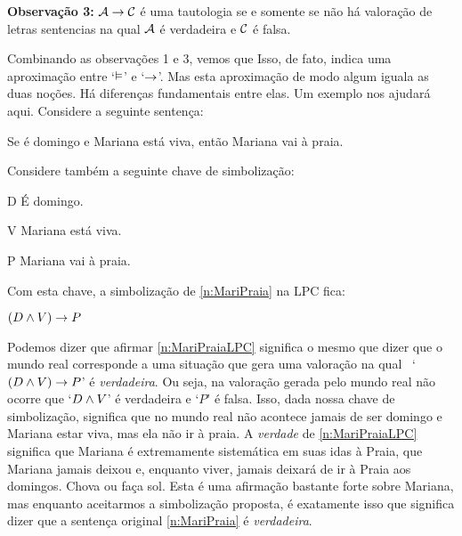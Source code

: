 	\begin{ebullet}
		\item[\textbf{Observação 3:}] $\mathcal{A} \rightarrow \mathcal{C}$ é uma tautologia se e somente se não há valoração de letras sentencias na qual $\mathcal{A}$ é verdadeira e $\mathcal{C}$ é falsa.
	\end{ebullet}
Combinando as observações 1 e 3, vemos que
Isso, de fato, indica uma aproximação entre `$\vDash$' e `$\rightarrow$'.
Mas esta aproximação de modo algum iguala as duas noções.
Há diferenças fundamentais entre elas.
Um exemplo nos ajudará aqui.
Considere a seguinte sentença:
	\begin{earg}\setcounter{eargnum}{4}
		\item \label{n:MariPraia}Se é domingo e Mariana está viva, então Mariana vai à praia.
	\end{earg}
Considere também a seguinte chave de simbolização:
\begin{ekey}
	\item[D] É domingo.
	\item [V] Mariana está viva.
	\item[P] Mariana vai à praia.
\end{ekey}
Com esta chave, a simbolização de \ref{n:MariPraia} na LPC fica:
	\begin{earg}\setcounter{eargnum}{5}
		\item \label{n:MariPraiaLPC}$(D \wedge V) \rightarrow P$
	\end{earg}
Podemos dizer que afirmar \ref{n:MariPraiaLPC} significa o mesmo que dizer que o mundo real corresponde a uma situação que gera uma valoração na qual \mbox{ `$(D \wedge V) \rightarrow P$'} é \emph{verdadeira}.
Ou seja, na valoração gerada pelo mundo real não ocorre que `$D \wedge V$' é verdadeira e `$P$' é falsa.
Isso, dada nossa chave de simbolização, significa que no mundo real não acontece jamais de ser domingo e Mariana estar viva, mas ela não ir à praia.
A \emph{verdade} de \ref{n:MariPraiaLPC} significa que Mariana é extremamente sistemática em suas idas à Praia, que Mariana jamais deixou e, enquanto viver, jamais deixará de ir à Praia aos domingos. Chova ou faça sol.
Esta é uma afirmação bastante forte sobre Mariana, mas enquanto aceitarmos a simbolização proposta, é exatamente isso que significa dizer que a sentença original \ref{n:MariPraia} é \emph{verdadeira}.

